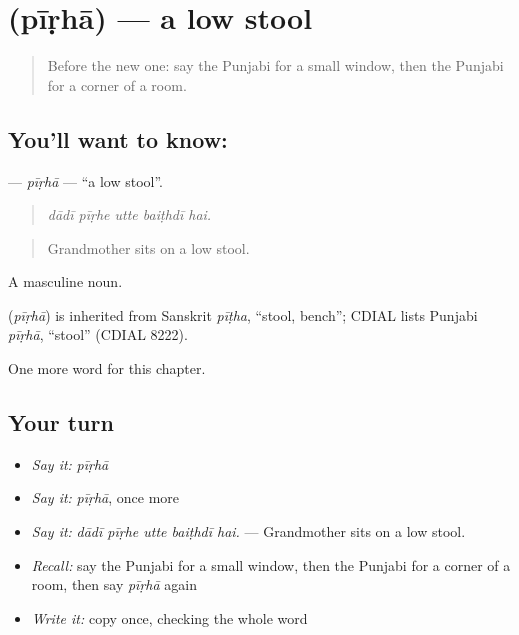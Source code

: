 \section[\texorpdfstring{\pa{ਪੀੜ੍ਹਾ} (pīṛhā)}{ਪੀੜ੍ਹਾ (pīṛhā)}]{ (pīṛhā) — a low stool}

\label{lesson:PA-C247-pirha}



\begin{quote}
Before the new one: say the Punjabi for a small window, then the Punjabi for a corner of a room.
\end{quote}

\subsection*{You'll want to know: }
\textbf{} — \emph{pīṛhā} — \textquotedblleft{}a low stool\textquotedblright{}.

\begin{quote}
    
\end{quote}

\begin{quote}
\emph{dādī pīṛhe utte baiṭhdī hai.}
\end{quote}

\begin{quote}
Grandmother sits on a low stool.
\end{quote}

A masculine noun.

\begin{cousinweb}
\textbf{} (\emph{pīṛhā}) is inherited from Sanskrit \emph{pīṭha}, \textquotedblleft{}stool, bench\textquotedblright{}; CDIAL lists Punjabi \emph{pīṛhā}, \textquotedblleft{}stool\textquotedblright{} (CDIAL 8222).
\end{cousinweb}

\begin{grammarlens}[title={What you've built}]
One more word for this chapter.
\end{grammarlens}

\subsection*{Your turn}
\begin{itemize}
\raggedright
  \item \emph{Say it:} \emph{pīṛhā}
  \item \emph{Say it:} \emph{pīṛhā}, once more
  \item \emph{Say it:} \emph{dādī pīṛhe utte baiṭhdī hai.} — Grandmother sits on a low stool.
  \item \emph{Recall:} say the Punjabi for a small window, then the Punjabi for a corner of a room, then say \emph{pīṛhā} again
  \item \emph{Write it:} copy \textbf{} once, checking the whole word
\end{itemize}


